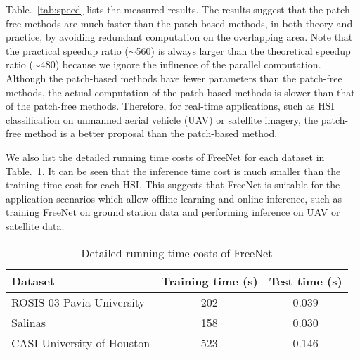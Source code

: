 \documentclass[journal]{IEEEtran}
\begin{document}
Table.~\ref{tab:speed} lists the measured results.
The results suggest that the patch-free methods are much faster than the patch-based methods, in both theory and practice, by avoiding redundant computation on the overlapping area.
Note that the practical speedup ratio ($\sim$560) is always larger than the theoretical speedup ratio ($\sim$480) because we ignore the influence of the parallel computation.
Although the patch-based methods have fewer parameters than the patch-free methods, the actual computation of the patch-based methods is slower than that of the patch-free methods.
Therefore, for real-time applications, such as HSI classification on unmanned aerial vehicle (UAV) or satellite imagery, the patch-free method is a better proposal than the patch-based method.


We also list the detailed running time costs of FreeNet for each dataset in Table.~\ref{tab:runingtime}.
It can be seen that the inference time cost is much smaller than the training time cost for each HSI.
This suggests that FreeNet is suitable for the application scenarios which allow offline learning and online inference, such as training FreeNet on ground station data and performing inference on UAV or satellite data.  

\begin{table}[]
  \caption{
    Detailed running time costs of FreeNet
    \label{tab:runingtime}}
  \centering
  \renewcommand{\arraystretch}{1.5}
  \begin{tabular}{l|c|c}
    \hline
    Dataset                    & Training time (s) & Test time (s) \\ \hline
    ROSIS-03 Pavia University  & 202               & 0.039         \\
    Salinas                    & 158               & 0.030         \\
    CASI University of Houston & 523               & 0.146         \\ \hline
  \end{tabular}
\end{table}
\end{document}
